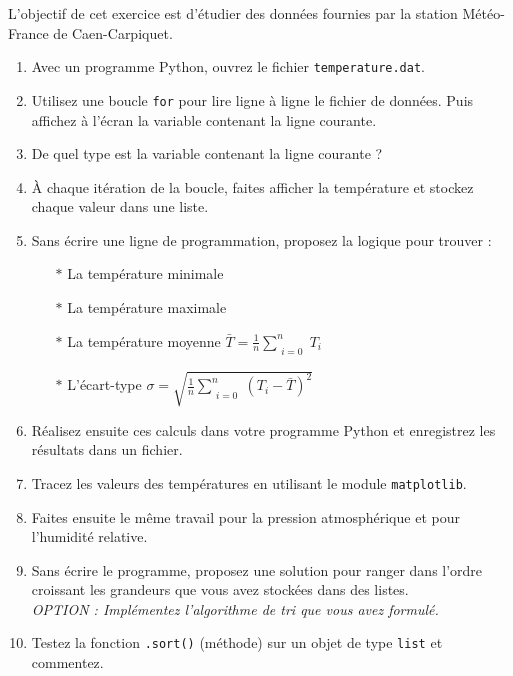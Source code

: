 L'objectif de cet  exercice est d'étudier des données  fournies par la
station Météo-France de Caen-Carpiquet.
\begin{enumerate}
\item Avec un programme Python, ouvrez le fichier \texttt{temperature.dat}.

\item Utilisez une boucle \texttt{for} pour lire ligne à ligne le fichier de données.
  Puis affichez à l'écran la variable contenant la ligne courante.

\item De quel type est la variable contenant la ligne courante ?


\item À chaque itération de la boucle, faites afficher la température et stockez chaque valeur dans une liste.

\item Sans écrire une ligne de programmation, proposez la logique pour trouver :
  \begin{itemize}
  \item[$\ast$] La température minimale
  \item[$\ast$] La température maximale
  \item[$\ast$] La température moyenne    $ \bar{T}= \frac{1}{n}  \sum\limits_{\substack{i=0}}^{n}{T_i}$
  \item[$\ast$] L'écart-type  $\sigma = \sqrt{\frac{1}{n}  \sum\limits_{\substack{i=0}}^{n}{} (T_i-\bar{T})^2   }$
  \end{itemize}

\item Réalisez ensuite ces calculs dans votre programme Python et enregistrez les résultats dans un fichier.

\item Tracez les valeurs des températures en utilisant le module \texttt{matplotlib}.

\item Faites ensuite le même travail pour la pression atmosphérique et pour l'humidité relative.

\item Sans écrire le programme, proposez une solution pour ranger dans l'ordre croissant
  les grandeurs que vous avez stockées dans des listes.\\
  \textit{OPTION : Implémentez l'algorithme de tri que vous avez formulé.}

\item Testez la fonction \texttt{.sort()} (méthode) sur un objet de type \texttt{list} et commentez.

\end{enumerate}
